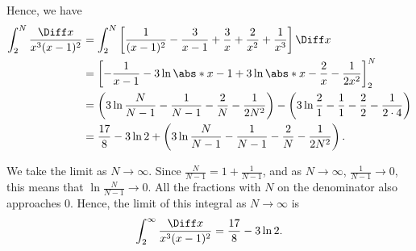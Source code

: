 \begin{enumerate}
          Hence, we have
          \begin{align*}
              \int_{2}^{N} \frac{\Diff x}{x^3 (x - 1)^2} & = \int_{2}^{N} \left[\frac{1}{(x - 1)^2} - \frac{3}{x - 1} + \frac{3}{x} + \frac{2}{x^2} + \frac{1}{x^3}\right] \Diff x                                                   \\
                                                         & = \left[- \frac{1}{x - 1} - 3 \ln \abs*{x - 1} + 3 \ln \abs*{x} - \frac{2}{x} - \frac{1}{2x^2}\right]_{2}^{N}                                                             \\
                                                         & = \left(3 \ln \frac{N}{N - 1} - \frac{1}{N - 1} - \frac{2}{N} - \frac{1}{2 N^2}\right) - \left(3 \ln \frac{2}{1} - \frac{1}{1} - \frac{2}{2} - \frac{1}{2 \cdot 4}\right) \\
                                                         & = \frac{17}{8} - 3 \ln 2 + \left(3 \ln \frac{N}{N - 1} - \frac{1}{N - 1} - \frac{2}{N} - \frac{1}{2 N^2}\right).
          \end{align*}

          We take the limit as \(N \to \infty\). Since \(\frac{N}{N - 1} = 1 + \frac{1}{N - 1}\), and as \(N \to \infty\), \(\frac{1}{N - 1} \to 0\), this means that \(\ln \frac{N}{N - 1} \to 0\). All the fractions with \(N\) on the denominator also approaches 0. Hence, the limit of this integral as \(N \to \infty\) is
          \[
              \int_{2}^{\infty} \frac{\Diff x}{x^3 (x - 1)^2} = \frac{17}{8} - 3 \ln 2.
          \]
\end{enumerate}
